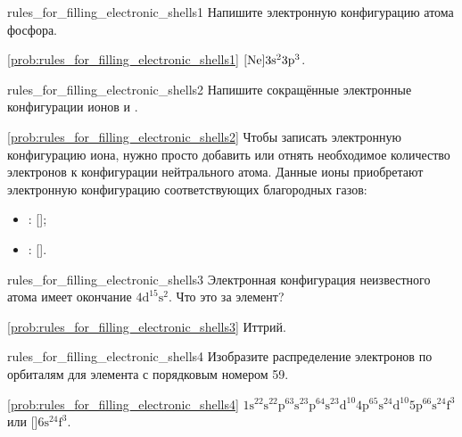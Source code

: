 \begin{problem}{}{rules_for_filling_electronic_shells1}
    Напишите электронную конфигурацию атома фосфора.
    \begin{sol}{\ref{prob:rules_for_filling_electronic_shells1}}
        $[\ce{Ne}]3\mathrm{s}^23\mathrm{p}^3$.
    \end{sol}
\end{problem}

\begin{problem}{}{rules_for_filling_electronic_shells2}
    Напишите сокращённые электронные конфигурации ионов  и .
    \begin{sol}{\ref{prob:rules_for_filling_electronic_shells2}}
        Чтобы записать электронную конфигурацию иона, нужно просто добавить или отнять необходимое количество электронов к конфигурации нейтрального атома. Данные ионы приобретают электронную конфигурацию соответствующих благородных газов:
        \begin{itemize}
            \item {}: [];
            \item {}: [].
        \end{itemize}
    \end{sol}
\end{problem}

\begin{problem}{}{rules_for_filling_electronic_shells3}
    Электронная конфигурация неизвестного атома имеет окончание $4\mathrm{d}^15\mathrm{s}^2$. Что это за элемент?
    \begin{sol}{\ref{prob:rules_for_filling_electronic_shells3}}
        Иттрий.
    \end{sol}
\end{problem}

\begin{problem}{}{rules_for_filling_electronic_shells4}
    Изобразите распределение электронов по орбиталям для элемента с порядковым номером 59.
    \begin{sol}{\ref{prob:rules_for_filling_electronic_shells4}}
        $1\mathrm{s}^22\mathrm{s}^22\mathrm{p}^63\mathrm{s}^23\mathrm{p}^64\mathrm{s}^23\mathrm{d}^{10}4\mathrm{p}^65\mathrm{s}^24\mathrm{d}^{10}5\mathrm{p}^66\mathrm{s}^24\mathrm{f}^3$ или []$6\mathrm{s}^24\mathrm{f}^3$.
    \end{sol}
\end{problem}

\clearpage

